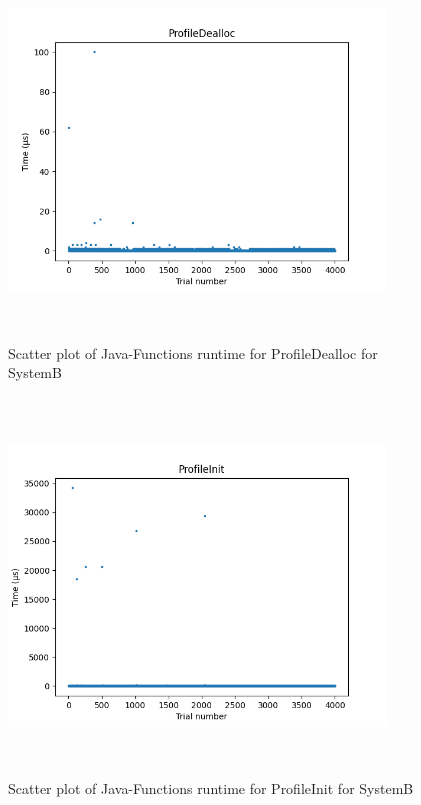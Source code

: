 \begin{figure}[H]
	\centering
	\includegraphics[width=10cm,height=10cm,keepaspectratio]{RuntimeResults_SystemB/JavaFunctions/ProfileDealloc_scatter.png}
	\caption{Scatter plot of Java-Functions runtime for ProfileDealloc for SystemB}
	\label{fig:Java-Functions|ProfileDealloc|SystemB}
\end{figure}

\begin{figure}[H]
	\centering
	\includegraphics[width=10cm,height=10cm,keepaspectratio]{RuntimeResults_SystemB/JavaFunctions/ProfileInit_scatter.png}
	\caption{Scatter plot of Java-Functions runtime for ProfileInit for SystemB}
	\label{fig:Java-Functions|ProfileInit|SystemB}
\end{figure}

